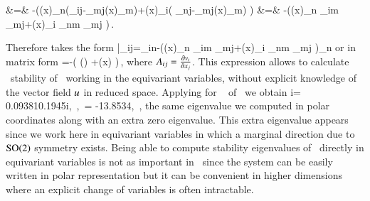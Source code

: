 			&=& -\left(\groupTan(x)_n\left(\Lg_{ij}-\Lg_{mj}\groupTan(x)_m\right)+\groupTan(x)_i\left( \Lg_{nj}-\Lg_{mj}\groupTan(x)_m\right) \right)\continue
			&=& -\left(\groupTan(x)_n \Pperp_{im} \Lg_{mj}+\groupTan(x)_i \Pperp_{nm} \Lg_{mj} \right)\,.
\eea

Therefore  takes the form
\beq
	\bar{\Mvar}_{ij}=\Pperp_{in}-\left(\groupTan(x)_n \Pperp_{im} \Lg_{mj}+\groupTan(x)_i \Pperp_{nm} \Lg_{mj} \right)\vf_n
\eeq
or in matrix form
\beq
	\mathbf{\bar{\Mvar}}=\PperpOp {}-\left(  \left(\PperpOp \Lg\right) +\groupTan(x) \otimes \left[\vf \cdot \left( \PperpOp \Lg\right)\right] \right)\,,
	\label{eq:reqvStab}
\eeq
where $A_{ij}=\frac{\partial v_i}{\partial x_j}$. This
expression allows to calculate \reducedsp\ stability of \reqva\ working
in the equivariant variables, without explicit knowledge of
the vector field  $u$ in reduced space. Applying
 for \reqv\  of \cLe\ we obtain
\beq
	\eigRe[1]\pm i\eigIm[1]= 0.0938\pm 10.1945i,\,
    ,\, \eigExp[4]= -13.8534,\, ,
\eeq
the same eigenvalue  we computed in
polar coordinates along with an extra zero eigenvalue. This extra
eigenvalue appears since we work here in equivariant variables
in which a marginal direction due to $\textrm{SO}(2)$ symmetry exists. Being
able to compute stability eigenvalues of \reqva\ directly in
equivariant variables is not as important in \cLe\ since the
system can be easily written in polar representation 
but it can be convenient in higher dimensions where an
explicit change of variables is often intractable.
